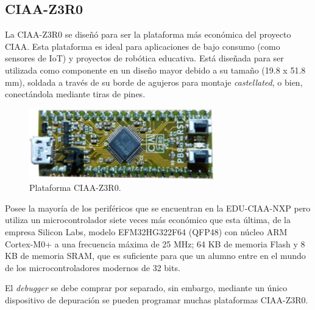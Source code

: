 
\subsection{CIAA-Z3R0}
\label{sec:CIAA-Z3R0}

La CIAA-Z3R0 se diseñó para ser la plataforma más económica del proyecto CIAA. Esta plataforma es ideal para aplicaciones de bajo consumo (como sensores de IoT) y proyectos de robótica educativa. Está diseñada para ser utilizada como componente en un diseño mayor debido a su tamaño (19.8 x 51.8 mm), soldada a través de su borde de agujeros para montaje \emph{castellated}, o bien, conectándola mediante tiras de pines.

\begin{figure}[!htbp]
\begin{center}  %
\includegraphics*[width=8cm]{Figures/CIAA-Z3R0_Foto.png}
\par\caption{Plataforma CIAA-Z3R0.}\label{fig:ciaaZero}
\end{center}
\end{figure}

Posee la mayoría de los periféricos que se encuentran en la EDU-CIAA-NXP pero utiliza un microcontrolador siete veces más económico que esta última, de la empresa Silicon Labs, modelo EFM32HG322F64 (QFP48) \citep{EFM32HG322F64} con núcleo ARM Cortex-M0+ a una frecuencia máxima de 25 MHz; 64 KB de memoria Flash y 8 KB de memoria SRAM, que es suficiente para que un alumno entre en el mundo de los microcontroladores modernos de 32 bits.

El \emph{debugger} se debe comprar por separado, sin embargo, mediante un único dispositivo de depuración se pueden programar muchas plataformas CIAA-Z3R0.


